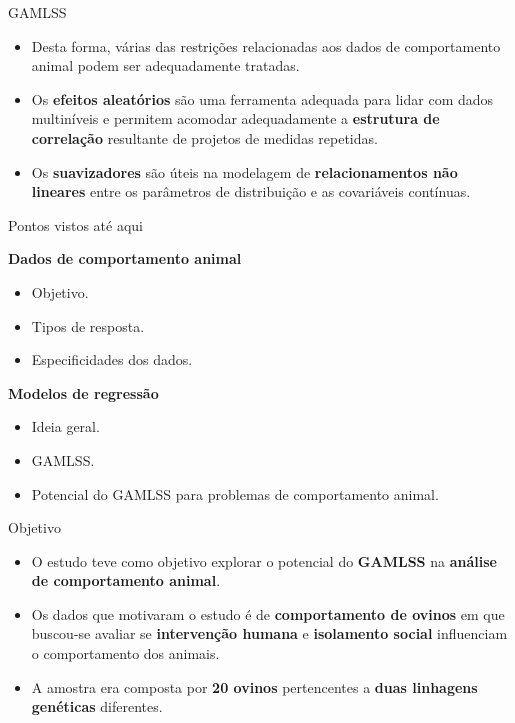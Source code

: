 \documentclass[
  ignorenonframetext,
  serif,
  professionalfont,
  usenames,
  dvipsnames,
  aspectratio = 169]{beamer}
\providecommand{\tightlist}{%
  \setlength{\itemsep}{0pt}\setlength{\parskip}{0pt}}
\renewcommand{\tightlist}{%
  \setlength{\itemsep}{0\baselineskip}
  \setlength{\parskip}{0.25\baselineskip}
}
\def\beginAHalfColumn{\begin{minipage}{0.49\textwidth}}%
\def\endColumns{\end{minipage}}%
\begin{document}
\begin{frame}{GAMLSS}
\protect\hypertarget{gamlss-1}{}
\begin{itemize}
\item
  Desta forma, várias das restrições relacionadas aos dados de
  comportamento animal podem ser adequadamente tratadas.
\item
  Os \textbf{efeitos aleatórios} são uma ferramenta adequada para lidar
  com dados multiníveis e permitem acomodar adequadamente a
  \textbf{estrutura de correlação} resultante de projetos de medidas
  repetidas.
\item
  Os \textbf{suavizadores} são úteis na modelagem de
  \textbf{relacionamentos não lineares} entre os parâmetros de
  distribuição e as covariáveis contínuas.
\end{itemize}
\end{frame}

\begin{frame}{Pontos vistos até aqui}
\protect\hypertarget{pontos-vistos-atuxe9-aqui}{}
\beginAHalfColumn

\textbf{Dados de comportamento animal}

\begin{itemize}
\tightlist
\item
  Objetivo.
\item
  Tipos de resposta.
\item
  Especificidades dos dados.
\end{itemize}

\vspace{0.5cm}

\textbf{Modelos de regressão}

\begin{itemize}
\tightlist
\item
  Ideia geral.
\item
  GAMLSS.
\item
  Potencial do GAMLSS para problemas de comportamento animal.
\end{itemize}

\endColumns
\beginAHalfColumn

\endColumns
\end{frame}

\begin{frame}{Objetivo}
\protect\hypertarget{objetivo}{}
\begin{itemize}
\item
  O estudo teve como objetivo explorar o potencial do \textbf{GAMLSS} na
  \textbf{análise de comportamento animal}.
\item
  Os dados que motivaram o estudo é de \textbf{comportamento de ovinos}
  em que buscou-se avaliar se \textbf{intervenção humana} e
  \textbf{isolamento social} influenciam o comportamento dos animais.
\item
  A amostra era composta por \textbf{20 ovinos} pertencentes a
  \textbf{duas linhagens genéticas} diferentes.
\end{itemize}
\end{frame}
\end{document}
